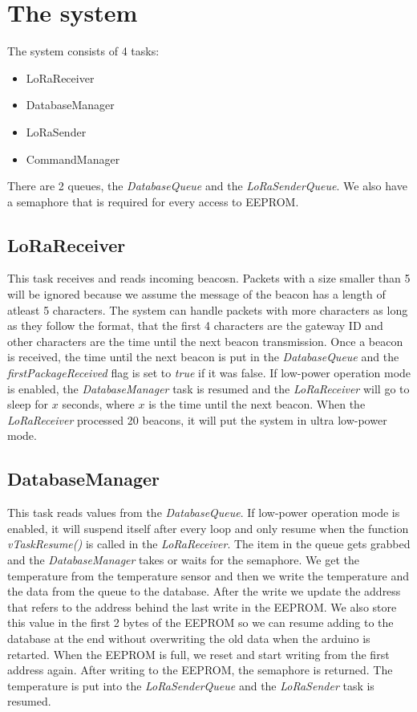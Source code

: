 \documentclass{scrartcl}
\begin{document}


\pagestyle{scrheadings}
\clearscrheadfoot

\cfoot{\pagemark}

\newpage

\section{The system}
The system consists of 4 tasks:
\begin{itemize}
    \item LoRaReceiver
    \item DatabaseManager
    \item LoRaSender
    \item CommandManager
\end{itemize}

There are 2 queues, the \textit{DatabaseQueue} and the \textit{LoRaSenderQueue}.
We also have a semaphore that is required for every access to EEPROM.

\subsection{LoRaReceiver}
This task receives and reads incoming beacosn. Packets with a size smaller than 5 will be ignored because
we assume the message of the beacon has a length of atleast 5 characters. The system can handle packets with more characters
as long as they follow the format, that the first 4 characters are the gateway ID and other characters are the time until the
next beacon transmission. Once a beacon is received, the time until the next beacon is put in the \textit{DatabaseQueue} and
the \textit{firstPackageReceived} flag is set to \textit{true} if it was false. If low-power operation mode is enabled,
the \textit{DatabaseManager} task is resumed and the \textit{LoRaReceiver} will go to sleep for $x$ seconds,
where $x$ is the time until the next beacon. When the \textit{LoRaReceiver} processed 20 beacons,
it will put the system in ultra low-power mode.

\subsection{DatabaseManager}
This task reads values from the \textit{DatabaseQueue}. If low-power operation mode is enabled, it will suspend itself after
every loop and only resume when the function \textit{vTaskResume()} is called in the \textit{LoRaReceiver}.
The item in the queue gets grabbed and the \textit{DatabaseManager} takes or waits for the
semaphore. We get the temperature from the temperature sensor and then we write the temperature and the data from the queue to the database.
After the write we update the address that refers to the address behind the last write in the EEPROM. We also store this value in the first
2 bytes of the EEPROM so we can resume adding to the database at the end without overwriting the old data when the arduino is retarted.
When the EEPROM is full, we reset and start writing from the first address again. After writing to the EEPROM, the semaphore is returned.
The temperature is put into the \textit{LoRaSenderQueue} and the \textit{LoRaSender} task is resumed.
\end{document}
